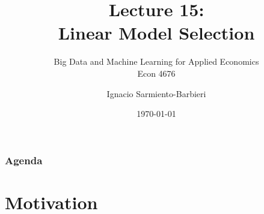\documentclass[
  shownotes,
  xcolor={svgnames},
  hyperref={colorlinks,citecolor=DarkBlue,linkcolor=DarkRed,urlcolor=DarkBlue}
  ]{beamer}
\begin{document}
\title[Lecture 15]{Lecture 15: \\ Linear Model Selection}
\subtitle{Big Data and Machine Learning for Applied Economics \\ Econ 4676}
\date{\today}

\author[Sarmiento-Barbieri]{Ignacio Sarmiento-Barbieri}


\begin{frame}[noframenumbering]
\maketitle
\end{frame}





\begin{frame}
\frametitle{Agenda}

\tableofcontents

\end{frame}

\section{Motivation }
\end{document}
